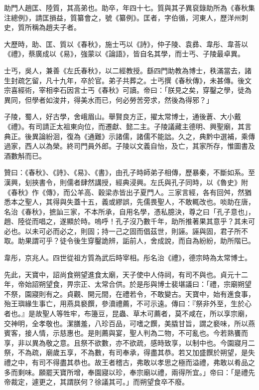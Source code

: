 \begin{pinyinscope}
 助門人趙匡、陸質，其高弟也。助卒，年四十七。質與其子異裒錄助所為《春秋集注總例》，請匡損益，質纂會之，號《纂例》。匡者，字伯循，河東人，歷洋州刺史，質所稱為趙夫子者。



 大歷時，助、匡、質以《春秋》，施士丐以《詩》，仲子陵、袁彞、韋彤、韋荅以《禮》，蔡廣成以《易》，強蒙以《論語》，皆自名其學，而士丐、子陵最卓異。



 士丐，吳人，兼善《左氏春秋》，以二經教授。繇四門助教為博士，秩滿當去，諸生封疏乞留，凡十九年，卒於官。弟子共葬之。士丐撰《春秋傳》，未甚傳。後文宗喜經術，宰相李石因言士丐《春秋》可讀。帝曰：「朕見之矣，穿鑿之學，徒為異同，但學者如浚井，得美水而已，何必勞苦旁求，然後為得邪？」



 子陵，蜀人，好古學，舍峨眉山。舉賢良方正，擢太常博士，通後蒼、大小戴《禮》。有司請正太祖東向位，而遷獻、懿二主。子陵議藏主德明、興聖廟，其言典正。後異論紛洄，復為《通難》示諸儒，諸儒不能詘。久之，典黔中選補，乘傳過家，西人以為榮。終司門員外郎。子陵以文義自怡，及亡，其家所存，惟圖書及酒數斛而已。



 贊曰：《春秋》、《詩》、《易》、《書》，由孔子時師弟子相傳，歷暴秦，不斷如系。至漢興，刬挾書令，則儒者肆然講授，經典浸興。左氏與孔子同時，以《魯史》附《春秋》作《傳》，而公羊高、穀梁赤皆出子夏門人。三家言經，各有回舛，然猶悉本之聖人，其得與失蓋十五，義或繆誤，先儒畏聖人，不敢輒改也。啖助在唐，名治《春秋》，摭訕三家，不本所承，自用名學，憑私臆決，尊之曰「孔子意也」，趙、陸從而唱之，遂顯於時。嗚呼！孔子沒乃數千年，助所推著果其意乎？其未可必也。以未可必而必之，則固；持一己之固而倡茲世，則誣。誣與固，君子所不取。助果謂可乎？徒令後生穿鑿詭辨，詬前人，舍成說，而自為紛紛，助所階已。



 韋彤，京兆人。四世從祖方質為武后時宰相。彤名治《禮》，德宗時為太常博士。



 先此，天寶中，詔尚食朔望進食太廟，天子使中人侍祠，有司不與也。貞元十二年，帝始詔朔望食，畀宗正、太常合供。於是彤與博士裴堪議曰：「禮，宗廟朔望不祭，園寢則有之。貞觀、開元間，在禮若令，不敢變古。天寶中，始有進食事，殆王璵緣生事亡，用燕具褻饌，參瀆禮薦，不可示遠。傳曰：『祭非外至，生於心者也。』是故聖人等牲牢，布籩豆，昆蟲、草木可薦者，莫不咸在，所以享宗廟，交神明，全孝敬也。潔膳羞，八珍百品，可嗜之饌，美膬甘旨，謂之褻味，所以燕賓客，接人情，示慈惠也。是則薦與宴，聖人判為二物，不可亂也。今若熟饔而享，非以異為敬之意。且祭不欲數，亦不欲疏，感時致享，以制中也。今園寢月二祭，不為疏，廟歲五享，不為數，有司奉承，得盡其恭。若又加盛饌於朔望，是失禮之中，有司不得盡其恭也。故王者稽古，弗敢以孝思之極而溢禮，弗敢以肴品之多而剩味。願罷天寶所增，奉園寢以珍，奉宗廟以禮，兩得所宜。」帝曰：「是禮先帝裁定，遽更之，其謂朕何？徐議其可。」而朔望食卒不廢。




\end{pinyinscope}
